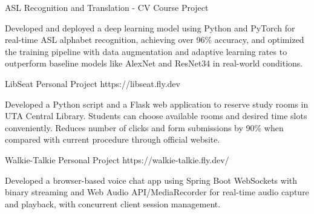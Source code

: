 \documentclass[10pt]{article}
\begin{document}
{    %

        \project
        {ASL Recognition and Translation - CV}
        {Course Project}
        {}
        {\begin{newitemize}
            \item {Developed and deployed a deep learning model using Python and PyTorch for real-time ASL alphabet recognition, achieving over 96\% accuracy, and optimized the training pipeline with data augmentation and adaptive learning rates to outperform baseline models like AlexNet and ResNet34 in real-world conditions.}
	    \end{newitemize}}

        \project
        {LibSeat}
        {Personal Project}
        {https://libseat.fly.dev}
        {\begin{newitemize}
            \item {Developed a Python script and a Flask web application to reserve study rooms in UTA Central Library. Students can choose available rooms and desired time slots conveniently. Reduces number of clicks and form submissions by 90\% when compared with current procedure through official website.}
	    \end{newitemize}}
 

        \project
        {Walkie-Talkie}
        {Personal Project}
        {https://walkie-talkie.fly.dev/}
        {\begin{newitemize}
            \item Developed a browser-based voice chat app using Spring Boot WebSockets with binary streaming and Web Audio API/MediaRecorder for real-time audio capture and playback, with concurrent client session management.
        \end{newitemize}}

}
\end{document}
